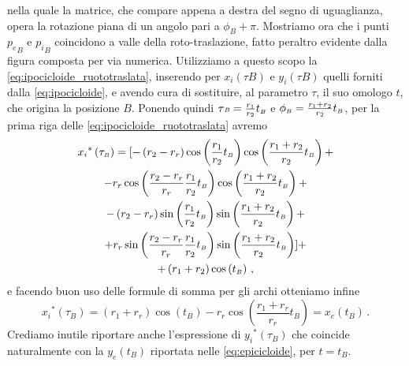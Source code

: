 \noindent nella quale la matrice, che compare
appena a destra del segno di uguaglianza, opera la rotazione piana di un angolo 
pari a $\phi_{\scriptscriptstyle B}+\pi$.
\noindent Mostriamo ora che i punti
${p_e}_{\scriptscriptstyle B}$ e ${p_i}_{\scriptscriptstyle B}$ coincidono
a valle della roto-traslazione,
fatto peraltro evidente dalla figura composta per via numerica.
Utilizziamo a questo scopo la \ref{eq:ipocicloide_ruototraslata}, inserendo per
${x_i}\left(\tau{\scriptscriptstyle B}\right)$ e ${y_i}\left(\tau{\scriptscriptstyle B}\right)$
quelli forniti dalla \ref{eq:ipocicloide}, e avendo cura di sostituire, al
parametro $\tau$, il suo omologo $t$, che origina la posizione $B$.
Ponendo quindi $\tau{\scriptscriptstyle B} = {r_1\over{r_2}}t_{\scriptscriptstyle B}$ e
$\phi_{\scriptscriptstyle B}={{r_1+r_2}\over{r_2}}t_{\scriptscriptstyle B}$,
per la prima riga delle \ref{eq:ipocicloide_ruototraslata} avremo
\begin{multline}
{x_i}^*\left(\tau_{\scriptscriptstyle B}\right)=
[-\left(r_2-r_r\right)\cos\left({r_1\over{r_2}}t_{\scriptscriptstyle B}\right)\cos\left({{r_1+r_2}\over{r_2}}t_{\scriptscriptstyle B}\right) + \\ -
r_r\cos\left({{r_2-r_r}\over{r_r}}{r_1\over{r_2}}t_{\scriptscriptstyle B}\right)\cos\left({{r_1+r_2}\over{r_2}}t_{\scriptscriptstyle B}\right) + \\ -
\left(r_2-r_r\right)\sin\left({r_1\over{r_2}}t_{\scriptscriptstyle B}\right)\sin\left({{r_1+r_2}\over{r_2}}t_{\scriptscriptstyle B}\right) + \\ +
r_r\sin\left({{r_2-r_r}\over{r_r}}{r_1\over{r_2}}t_{\scriptscriptstyle B}\right)\sin\left({{r_1+r_2}\over{r_2}}t_{\scriptscriptstyle B}\right)] + \\ +
\left(r_1+r_2\right)\cos\left(t_{\scriptscriptstyle B}\right)\,,
\label{eq:inviluppo_x}
\end{multline}
\noindent e facendo buon uso delle formule di somma per gli archi
otteniamo infine
\begin{equation}
{x_i}^*\left(\tau_{\scriptscriptstyle B}\right)=\left(r_1+r_r\right)\cos\left(t_{\scriptscriptstyle B}\right) -
r_r\cos\left(\dfrac{r_1+r_r}{r_r}t_{\scriptscriptstyle B}\right)=
{x_e}\left(t_{\scriptscriptstyle B}\right)\,.
\label{eq:invdimostrato}
\end{equation}
\noindent Crediamo inutile riportare anche l'espressione
di ${y_i}^*\left(\tau_{\scriptscriptstyle B}\right)$ che coincide naturalmente
con la
${y_e}\left(t_{\scriptscriptstyle B}\right)$
riportata nelle \ref{eq:epicicloide}, per $t=t_{\scriptscriptstyle B}$.
